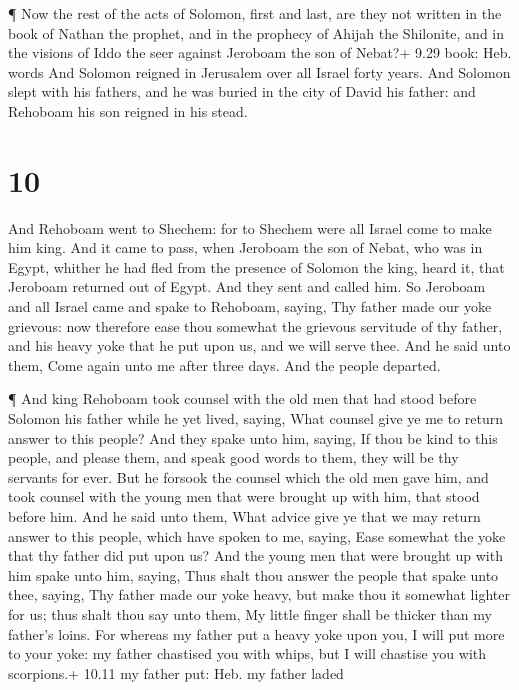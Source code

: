  ¶ Now the rest of the acts of Solomon, first and last, are
they not written in the book of Nathan the prophet, and in the prophecy
of Ahijah the Shilonite, and in the visions of Iddo the seer against
Jeroboam the son of Nebat?+ 9.29 book: Heb. words  And
Solomon reigned in Jerusalem over all Israel forty years. 
And Solomon slept with his fathers, and he was buried in the city of
David his father: and Rehoboam his son reigned in his stead.

\hypertarget{section-9}{%
\section{10}\label{section-9}}

 And Rehoboam went to Shechem: for to Shechem were all
Israel come to make him king.  And it came to pass, when
Jeroboam the son of Nebat, who was in Egypt, whither he had fled from
the presence of Solomon the king, heard it, that Jeroboam returned out
of Egypt.  And they sent and called him. So Jeroboam and all
Israel came and spake to Rehoboam, saying,  Thy father made
our yoke grievous: now therefore ease thou somewhat the grievous
servitude of thy father, and his heavy yoke that he put upon us, and we
will serve thee.  And he said unto them, Come again unto me
after three days. And the people departed.

 ¶ And king Rehoboam took counsel with the old men that had
stood before Solomon his father while he yet lived, saying, What counsel
give ye me to return answer to this people?  And they spake
unto him, saying, If thou be kind to this people, and please them, and
speak good words to them, they will be thy servants for ever.
 But he forsook the counsel which the old men gave him, and
took counsel with the young men that were brought up with him, that
stood before him.  And he said unto them, What advice give
ye that we may return answer to this people, which have spoken to me,
saying, Ease somewhat the yoke that thy father did put upon us?
 And the young men that were brought up with him spake unto
him, saying, Thus shalt thou answer the people that spake unto thee,
saying, Thy father made our yoke heavy, but make thou it somewhat
lighter for us; thus shalt thou say unto them, My little finger shall be
thicker than my father's loins.  For whereas my father put
a heavy yoke upon you, I will put more to your yoke: my father chastised
you with whips, but I will chastise you with scorpions.+ 10.11 my father
put: Heb. my father laded

